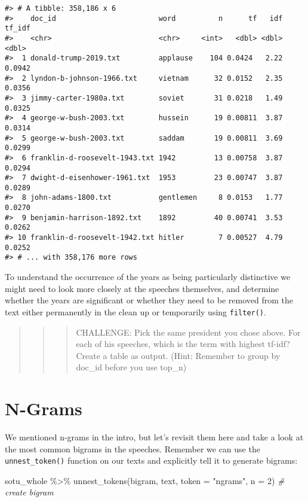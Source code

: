 \documentclass[
]{book}
\newenvironment{Shaded}{\begin{snugshade}}{\end{snugshade}}
\newcommand{\AttributeTok}[1]{\textcolor[rgb]{0.77,0.63,0.00}{#1}}
\newcommand{\CommentTok}[1]{\textcolor[rgb]{0.56,0.35,0.01}{\textit{#1}}}
\newcommand{\DecValTok}[1]{\textcolor[rgb]{0.00,0.00,0.81}{#1}}
\newcommand{\FunctionTok}[1]{\textcolor[rgb]{0.00,0.00,0.00}{#1}}
\newcommand{\NormalTok}[1]{#1}
\newcommand{\SpecialCharTok}[1]{\textcolor[rgb]{0.00,0.00,0.00}{#1}}
\newcommand{\StringTok}[1]{\textcolor[rgb]{0.31,0.60,0.02}{#1}}
\begin{document}
\begin{verbatim}
#> # A tibble: 358,186 x 6
#>    doc_id                        word          n      tf   idf tf_idf
#>    <chr>                         <chr>     <int>   <dbl> <dbl>  <dbl>
#>  1 donald-trump-2019.txt         applause    104 0.0424   2.22 0.0942
#>  2 lyndon-b-johnson-1966.txt     vietnam      32 0.0152   2.35 0.0356
#>  3 jimmy-carter-1980a.txt        soviet       31 0.0218   1.49 0.0325
#>  4 george-w-bush-2003.txt        hussein      19 0.00811  3.87 0.0314
#>  5 george-w-bush-2003.txt        saddam       19 0.00811  3.69 0.0299
#>  6 franklin-d-roosevelt-1943.txt 1942         13 0.00758  3.87 0.0294
#>  7 dwight-d-eisenhower-1961.txt  1953         23 0.00747  3.87 0.0289
#>  8 john-adams-1800.txt           gentlemen     8 0.0153   1.77 0.0270
#>  9 benjamin-harrison-1892.txt    1892         40 0.00741  3.53 0.0262
#> 10 franklin-d-roosevelt-1942.txt hitler        7 0.00527  4.79 0.0252
#> # ... with 358,176 more rows
\end{verbatim}

To understand the occurrence of the years as being particularly distinctive we might need to look more closely at the speeches themselves, and determine whether the years are significant or whether they need to be removed from the text either permanently in the clean up or temporarily using \texttt{filter()}.

\begin{quote}
\begin{quote}
\begin{quote}
CHALLENGE: Pick the same president you chose above. For each of his speeches, which is the term with highest tf-idf? Create a table as output. (Hint: Remember to group by doc\_id before you use top\_n)
\end{quote}
\end{quote}
\end{quote}

\hypertarget{n-grams}{%
\section{N-Grams}\label{n-grams}}

We mentioned n-grams in the intro, but let's revisit them here and take a look at the most common bigrams in the speeches. Remember we can use the \texttt{unnest\_token()} function on our texts and explicitly tell it to generate bigrams:

\begin{Shaded}
\begin{Highlighting}[]
\NormalTok{sotu\_whole }\SpecialCharTok{\%\textgreater{}\%}
  \FunctionTok{unnest\_tokens}\NormalTok{(bigram, text, }\AttributeTok{token =} \StringTok{"ngrams"}\NormalTok{, }\AttributeTok{n =} \DecValTok{2}\NormalTok{) }\CommentTok{\# create bigram}
\end{Highlighting}
\end{Shaded}
\end{document}
